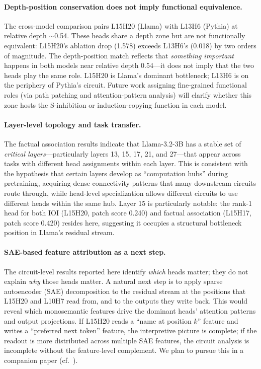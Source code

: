 \documentclass[11pt,a4paper]{article}
\begin{document}
\paragraph{Depth-position conservation does not imply functional equivalence.}
The cross-model comparison pairs L15H20 (Llama) with L13H6 (Pythia) at relative depth
$\sim$0.54. These heads share a depth zone but are not functionally equivalent:
L15H20's ablation drop (1.578) exceeds L13H6's (0.018) by two orders of magnitude.
The depth-position match reflects that \emph{something important} happens in both
models near relative depth 0.54---it does not imply that the two heads play the same
role. L15H20 is Llama's dominant bottleneck; L13H6 is on the periphery of Pythia's
circuit. Future work assigning fine-grained functional roles (via path patching and
attention-pattern analysis) will clarify whether this zone hosts the S-inhibition or
induction-copying function in each model.

\paragraph{Layer-level topology and task transfer.}
The factual association results indicate that Llama-3.2-3B has a stable set of
\emph{critical layers}---particularly layers 13, 15, 17, 21, and 27---that appear
across tasks with different head assignments within each layer. This is consistent with
the hypothesis that certain layers develop as ``computation hubs'' during pretraining,
acquiring dense connectivity patterns that many downstream circuits route through,
while head-level specialization allows different circuits to use different heads within
the same hub. Layer 15 is particularly notable: the rank-1 head for both IOI
(L15H20, patch score 0.240) and factual association (L15H17, patch score 0.420) resides
here, suggesting it occupies a structural bottleneck position in Llama's residual
stream.

\paragraph{SAE-based feature attribution as a next step.}
The circuit-level results reported here identify \emph{which} heads matter; they do not
explain \emph{why} those heads matter. A natural next step is to apply sparse
autoencoder (SAE) decomposition to the residual stream at the positions that L15H20
and L10H7 read from, and to the outputs they write back. This would reveal which
monosemantic features drive the dominant heads' attention patterns and output
projections. If L15H20 reads a ``name at position $k$'' feature and writes a
``preferred next token'' feature, the interpretive picture is complete; if the readout
is more distributed across multiple SAE features, the circuit analysis is incomplete
without the feature-level complement. We plan to pursue this in a companion paper
(cf.\ \citealt{elhage2022toy}).
\end{document}
